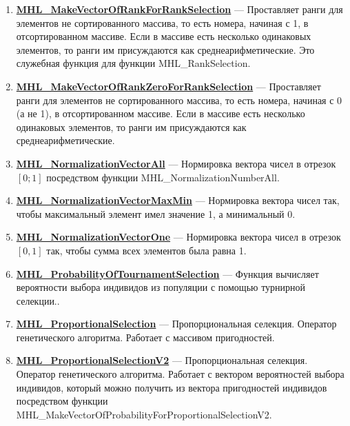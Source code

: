 \documentclass[a4paper,12pt]{article}
\begin{document}
\begin{enumerate}
\item \textbf{\hyperref[MHL_MakeVectorOfRankForRankSelection]{MHL\_MakeVectorOfRankForRankSelection}} --- Проставляет ранги для элементов не сортированного массива, то есть номера, начиная с 1, в отсортированном массиве.  Если в массиве есть несколько одинаковых элементов, то ранги им присуждаются как среднеарифметические. Это служебная функция для функции MHL\_RankSelection.

\item \textbf{\hyperref[MHL_MakeVectorOfRankZeroForRankSelection]{MHL\_MakeVectorOfRankZeroForRankSelection}} --- Проставляет ранги для элементов не сортированного массива, то есть номера, начиная с 0 (а не 1), в отсортированном массиве.  Если в массиве есть несколько одинаковых элементов, то ранги им присуждаются как среднеарифметические.

\item \textbf{\hyperref[MHL_NormalizationVectorAll]{MHL\_NormalizationVectorAll}} --- Нормировка вектора чисел в отрезок $[0;1]$ посредством функции MHL\_NormalizationNumberAll.

\item \textbf{\hyperref[MHL_NormalizationVectorMaxMin]{MHL\_NormalizationVectorMaxMin}} --- Нормировка вектора чисел так, чтобы максимальный элемент имел значение 1, а минимальный 0.

\item \textbf{\hyperref[MHL_NormalizationVectorOne]{MHL\_NormalizationVectorOne}} --- Нормировка вектора чисел в отрезок $[0,1]$ так, чтобы сумма всех элементов была равна 1.

\item \textbf{\hyperref[MHL_ProbabilityOfTournamentSelection]{MHL\_ProbabilityOfTournamentSelection}} --- Функция вычисляет вероятности выбора индивидов из популяции с помощью турнирной селекции..

\item \textbf{\hyperref[MHL_ProportionalSelection]{MHL\_ProportionalSelection}} --- Пропорциональная селекция. Оператор генетического алгоритма. Работает с массивом пригодностей.

\item \textbf{\hyperref[MHL_ProportionalSelectionV2]{MHL\_ProportionalSelectionV2}} --- Пропорциональная селекция. Оператор генетического алгоритма. Работает с вектором вероятностей выбора индивидов, который можно получить из вектора пригодностей индивидов посредством функции MHL\_MakeVectorOfProbabilityForProportionalSelectionV2.


\end{enumerate}
\end{document}
